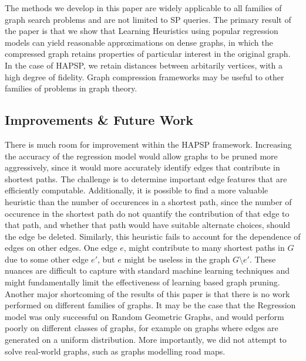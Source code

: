 \documentclass[10.5pt,journal]{IEEEtran}
\begin{document}
		
		The methods we develop in this paper are widely applicable to all families of graph search
		problems and are not limited to SP queries. The primary result of the paper is that we
		show that Learning Heuristics using popular regression models can yield reasonable
		approximations on dense graphs, in which the compressed graph retains properties of
		particular interest in the original graph. In the case of HAPSP, we retain distances between
		arbitarily vertices, with a high degree of fidelity. Graph compression frameworks may be
		useful to other families of problems in graph theory.
		
	\subsection{Improvements \& Future Work}
		There is much room for improvement within the HAPSP framework. Increasing the accuracy of the
		regression model would allow graphs to be pruned more aggressively, since it would more
		accurately identify edges that contribute in shortest paths. The challenge is to determine
		important edge features that are efficiently computable. Additionally, it is possible to
		find a more valuable heuristic than the number of occurences in a shortest path, since
		the number of occurence in the shortest path do not quantify the contribution of that edge
		to that path, and whether that path would have suitable alternate choices, should the edge
		be deleted. Similarly, this heuristic fails to account for the dependence of edges on
		other edges. One edge $e$, might contribute to many shortest paths in $G$ due to some
		other edge $e'$, but $e$ might be useless in the graph $G\setminus e'$. These nuances
		are difficult to capture with standard machine learning techniques and might fundamentally
		limit the effectiveness of learning based graph pruning. \\
		
		Another major shortcoming of the results of this paper is that there is no work performed
		on different families of graphs. It may be the case that the Regression model was only
		successful on Random Geometric Graphs, and would perform poorly on different classes of graphs,
		for example
		on graphs where edges are generated on a uniform distribution. More importantly,
		we did not attempt to solve real-world graphs, such as graphs modelling road maps.
		
\end{document}
